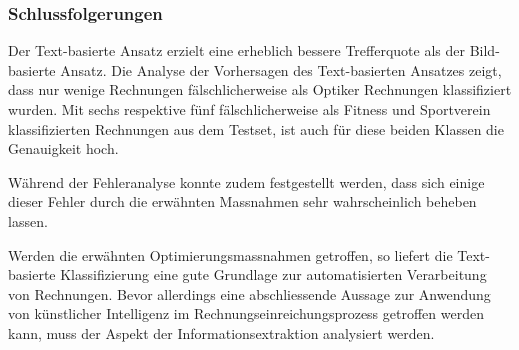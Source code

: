 \subsubsection{Schlussfolgerungen}

Der Text-basierte Ansatz erzielt eine erheblich bessere Trefferquote als der Bild-basierte Ansatz. Die Analyse der Vorhersagen des Text-basierten Ansatzes zeigt, dass nur wenige Rechnungen fälschlicherweise als Optiker Rechnungen klassifiziert wurden. Mit sechs respektive fünf fälschlicherweise als Fitness und Sportverein klassifizierten Rechnungen aus dem Testset, ist auch für diese beiden Klassen die Genauigkeit hoch. 


Während der Fehleranalyse konnte zudem festgestellt werden, dass sich einige dieser Fehler durch die erwähnten Massnahmen sehr wahrscheinlich beheben lassen.

Werden die erwähnten Optimierungsmassnahmen getroffen, so liefert die Text-basierte Klassifizierung eine gute Grundlage zur automatisierten Verarbeitung von Rechnungen. Bevor allerdings eine abschliessende Aussage zur Anwendung von künstlicher Intelligenz im Rechnungseinreichungsprozess getroffen werden kann, muss der Aspekt der Informationsextraktion analysiert werden.
